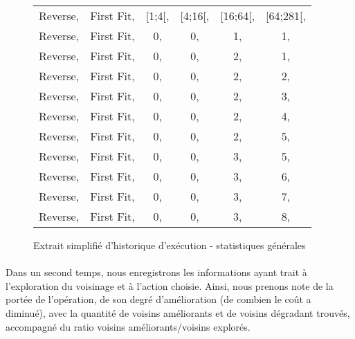 \documentclass[a4paper,10pt]{report}
\begin{document}
\begin{figure}[h]
  \begin{center}
    \begin{tabular}{cccccc}
      Reverse,&First Fit,&[1;4[,&[4;16[,&[16;64[,&[64;281[,\\
      Reverse,&First Fit,&0,    &0,     &1,      &1,\\
      Reverse,&First Fit,&0,    &0,     &2,      &1,\\
      Reverse,&First Fit,&0,    &0,     &2,      &2,\\
      Reverse,&First Fit,&0,    &0,     &2,      &3,\\
      Reverse,&First Fit,&0,    &0,     &2,      &4,\\
      Reverse,&First Fit,&0,    &0,     &2,      &5,\\
      Reverse,&First Fit,&0,    &0,     &3,      &5,\\
      Reverse,&First Fit,&0,    &0,     &3,      &6,\\
      Reverse,&First Fit,&0,    &0,     &3,      &7,\\
      Reverse,&First Fit,&0,    &0,     &3,      &8,\\
    \end{tabular}
  \end{center}
  \label{a280-sample-interval-simple}
  \caption{Extrait simplifié d'historique d'exécution - statistiques générales}
\end{figure}

\paragraph{}
  Dans un second temps, nous enregistrons les informations ayant trait à
l'exploration du voisinage et à l'action choisie. Ainsi, nous prenons note de
la portée de l'opération, de son degré d'amélioration (de combien le coût a
diminué), avec la quantité de voisins améliorants et de voisins dégradant
trouvés, accompagné du ratio voisins améliorants/voisins explorés.
\end{document}
